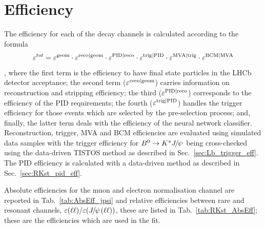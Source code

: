 \section{Efficiency}
\label{sec:RKst_efficiency}

The efficiency for each of the decay channels is calculated according to the formula
%
$$\varepsilon^{tot} = \varepsilon^{\rm geom} \cdot \varepsilon^{\rm reco|geom} \cdot \varepsilon^{\rm PID|reco} \cdot \varepsilon^{\rm trig|PID} \cdot \varepsilon^{\rm MVA|trig}\cdot \varepsilon^{\rm BCM|MVA}$$,
%
where the first term is the efficiency to have final state particles in the LHCb detector 
acceptance; the second term ($\varepsilon^{\rm reco|geom}$) carries information on reconstruction and stripping efficiency;
the third ($\varepsilon^{\rm PID|reco}$) corresponds to the efficiency of the PID requirements;
the fourth ($\varepsilon^{\rm trig|PID}$) handles the trigger efficiency for those events which
are selected by the pre-selection process; and, finally, the latter term deals with the efficiency of the neural network classifier.
Reconstruction, trigger, MVA and BCM efficiencies are evaluated using simulated data samples with the trigger efficiency
for $\Bz\to\Kstar\jpsi$ being cross-checked using the data-driven TISTOS method as described in Sec.~\ref{sec:Lb_trigger_eff}.
The PID efficiency is calculated with a data-driven method as described in Sec.~\ref{sec:RKst_pid_eff}.

Absolute efficiencies for the muon and electron normalisation channel are reported in Tab.~\ref{tab:AbsEff_jpsi}
and relative efficiencies between rare and resonant channels, 
$\varepsilon(\ell\ell)/\varepsilon(\jpsi(\ell\ell))$, these are listed in Tab.~\ref{tab:RKst_AbsEff};
these are the efficiencies which are used in the fit.

%
%
%
%

